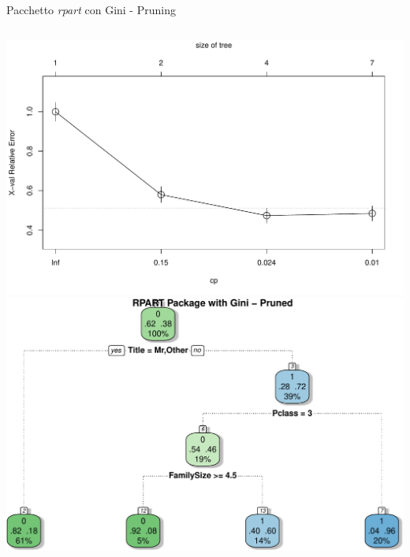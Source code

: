 \documentclass[9pt, xcolor=table]{beamer}
\begin{document}
	\begin{frame}{Pacchetto \textit{rpart} con Gini - Pruning}
		
		
		\vfill
		
		\begin{columns}
			\centering
			\includegraphics[scale=0.26]{rpart-gini-size-plot}
			\centering
			\includegraphics[scale=0.28]{rpart-gini-pruned}
		\end{columns}	
	\end{frame}

	\iffalse
\end{document}
